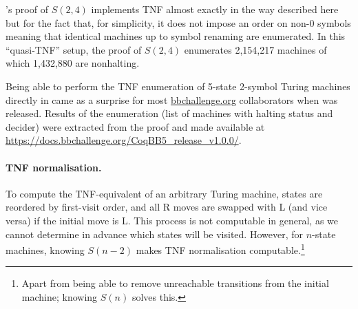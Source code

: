 \CoqBB's proof of $S(2,4)$ implements TNF almost exactly in the way described here but for the fact that, for simplicity, it does not impose an order on non-0 symbols meaning that identical machines up to symbol renaming are enumerated. In this ``quasi-TNF'' setup, the proof of $S(2,4)$ enumerates 2,154,217 machines of which 1,432,880 are nonhalting.

Being able to perform the TNF enumeration of 5-state 2-symbol Turing machines directly in \Coq came as a surprise for most \url{bbchallenge.org} collaborators when \CoqBB was released. Results of the enumeration (\ie list of machines with halting status and decider) were extracted from the proof and made available at \url{https://docs.bbchallenge.org/CoqBB5_release_v1.0.0/}.




\paragraph{TNF normalisation.} To compute the TNF-equivalent of an arbitrary Turing machine, states are reordered by first-visit order, and all R moves are swapped with L (and vice versa) if the initial move is L. This process is not computable in general, as we cannot determine in advance which states will be visited. However, for $n$-state machines, knowing $S(n-2)$ makes TNF normalisation computable.\footnote{Apart from being able to remove unreachable transitions from the initial machine; knowing $S(n)$ solves this. } %

